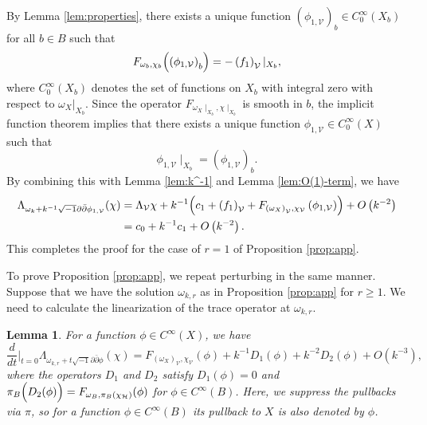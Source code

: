 \documentclass{amsart}
\numberwithin{equation}{section}
\theoremstyle{plain}
\newtheorem{lemma}[equation]{Lemma}
\theoremstyle{definition}
\theoremstyle{remark}
\begin{document}
By Lemma \ref{lem:properties}, there exists a unique function $\left( \phi_{1, \mathcal{V}} \right)_b \in C^\infty_0(X_b)$ for all $b \in B$  such that
$$F_{ \omega_b, \chi_b} \Bigl( \left( \phi_{1, \mathcal{V}} \right)_b \Bigr) = - \left( f_1 \right)_\mathcal{V}\vert_{X_b},$$
where $C^\infty_0(X_b)$ denotes the set of functions on $X_b$ with integral zero with respect to $\omega_X\vert_{X_b}$. 
Since the operator $F_{ \omega_X\mid_{X_b}, \chi\mid_{X_b}}$ is smooth in $b$, the implicit function theorem implies that there exists a unique function $\phi_{1, \mathcal{V}} \in C^\infty_0(X)$ such that 
$$ \phi_{1, \mathcal{V}}\mid_{X_b} = \left( \phi_{1, \mathcal{V}} \right)_b.$$
By combining this with Lemma \ref{lem:k^-1} and Lemma \ref{lem:O(1)-term}, we have 
\begin{align*}
\Lambda_{\omega_k + k^{-1} \sqrt{-1} \partial \bar{\partial} \phi_{1, \mathcal{V}}} (\chi)
&= \Lambda_\mathcal{V} \chi + k^{-1} \Bigl( c_1 + \left(f_1 \right)_\mathcal{V} + F_{ \left( \omega_X \right)_\mathcal{V}, \chi_\mathcal{V}} \left(\phi_{1, \mathcal{V}} \right) \Bigr) + O \left(k^{-2} \right) \\
&= c_0 + k^{-1} c_1 + O \left( k^{-2} \right).
\end{align*}
This completes the proof for the case of $r = 1$ of Proposition \ref{prop:app}.

To prove Proposition \ref{prop:app}, we repeat perturbing in the same manner. Suppose that we have the solution $\omega_{k, r}$ as in Proposition \ref{prop:app} for $r \ge 1$.
We need to calculate the linearization of the trace operator at $\omega_{k, r}$.

\begin{lemma}\label{lem:general_linearisation}
For a function $\phi \in C^\infty(X)$, we have
$$\frac{d}{dt}\Big|_{t = 0} \Lambda_{\omega_{k, r} + t \sqrt{-1} \partial \bar{\partial} \phi } (\chi) 
= F_{\left(\omega_X \right)_\mathcal{V}, \chi_\mathcal{V}} \left(\phi \right) + k^{-1} D_1 \left( \phi \right) + k^{-2} D_2 \left( \phi \right) + O \left( k^{-3} \right),$$
where the operators $D_1$ and $D_2$ satisfy
$D_1(\phi) = 0$ and $\pi_B \Bigl( D_2 (\phi) \Bigr) = F_{\omega_B, \pi_B(\chi_\mathcal{H})} (\phi)$
for $\phi \in C^\infty(B)$. Here, we suppress the pullbacks via $\pi$,
so for a function $\phi\in C^\infty(B)$ its pullback to $X$ is also denoted by $\phi$.
\end{lemma}
\end{document}
